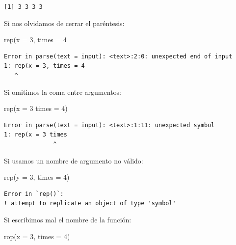\documentclass[
  spanish,
  a4paper,
]{scrbook}
\newenvironment{Shaded}{\begin{snugshade}}{\end{snugshade}}
\newcommand{\AttributeTok}[1]{\textcolor[rgb]{0.40,0.45,0.13}{#1}}
\newcommand{\DecValTok}[1]{\textcolor[rgb]{0.68,0.00,0.00}{#1}}
\newcommand{\FunctionTok}[1]{\textcolor[rgb]{0.28,0.35,0.67}{#1}}
\newcommand{\NormalTok}[1]{\textcolor[rgb]{0.00,0.23,0.31}{#1}}
\begin{document}
\begin{verbatim}
[1] 3 3 3 3
\end{verbatim}

Si nos olvidamos de cerrar el paréntesis:

\begin{Shaded}
\begin{Highlighting}[]
\FunctionTok{rep}\NormalTok{(}\AttributeTok{x =} \DecValTok{3}\NormalTok{, }\AttributeTok{times =} \DecValTok{4}
\end{Highlighting}
\end{Shaded}

\begin{verbatim}
Error in parse(text = input): <text>:2:0: unexpected end of input
1: rep(x = 3, times = 4
   ^
\end{verbatim}

Si omitimos la coma entre argumentos:

\begin{Shaded}
\begin{Highlighting}[]
\FunctionTok{rep}\NormalTok{(}\AttributeTok{x =} \DecValTok{3} \AttributeTok{times =} \DecValTok{4}\NormalTok{)}
\end{Highlighting}
\end{Shaded}

\begin{verbatim}
Error in parse(text = input): <text>:1:11: unexpected symbol
1: rep(x = 3 times
              ^
\end{verbatim}

Si usamos un nombre de argumento no válido:

\begin{Shaded}
\begin{Highlighting}[]
\FunctionTok{rep}\NormalTok{(}\AttributeTok{y =} \DecValTok{3}\NormalTok{, }\AttributeTok{times =} \DecValTok{4}\NormalTok{)}
\end{Highlighting}
\end{Shaded}

\begin{verbatim}
Error in `rep()`:
! attempt to replicate an object of type 'symbol'
\end{verbatim}

Si escribimos mal el nombre de la función:

\begin{Shaded}
\begin{Highlighting}[]
\FunctionTok{rop}\NormalTok{(}\AttributeTok{x =} \DecValTok{3}\NormalTok{, }\AttributeTok{times =} \DecValTok{4}\NormalTok{)}
\end{Highlighting}
\end{Shaded}
\end{document}
